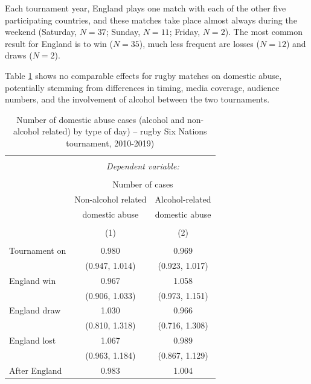 \documentclass[12pt, a4paper]{article}
\begin{document}
Each tournament year, England plays one match with each of the other five participating countries, and these matches take place almost always during the weekend (Saturday, $N = 37$; Sunday, $N = 11$; Friday, $N = 2$). The most common result for England is to win ($N = 35$), much less frequent are losses ($N = 12$) and draws ($N = 2$).


Table \ref{rugby} shows no comparable effects for rugby matches on domestic abuse, potentially stemming from differences in timing, media coverage, audience numbers, and the involvement of alcohol between the two tournaments. 


\begin{table}[!htbp] \centering 
  \begin{threeparttable}
  \caption{Number of domestic abuse cases (alcohol and non-alcohol related) by type of day) -- rugby Six Nations tournament, 2010-2019)} 
  \label{rugby} 
\begin{tabular}{@{\extracolsep{5pt}}lcc} 
\\[-1.8ex]\hline 
\hline \\[-1.8ex] 
 & \multicolumn{2}{c}{\textit{Dependent variable:}} \\ 
\cline{2-3} 
\\[-1.8ex] & \multicolumn{2}{c}{Number of cases} \\ 
 & Non-alcohol related & Alcohol-related\\ 
 & domestic abuse & domestic abuse\\
\\[-1.8ex] & (1) & (2)\\ 
\hline \\[-1.8ex] 
 Tournament on & 0.980 & 0.969 \\ 
  & (0.947, 1.014) & (0.923, 1.017) \\ 
 England win & 0.967 & 1.058 \\ 
  & (0.906, 1.033) & (0.973, 1.151) \\ 
 England draw & 1.030 & 0.966 \\ 
  & (0.810, 1.318) & (0.716, 1.308) \\ 
 England lost & 1.067 & 0.989 \\ 
  & (0.963, 1.184) & (0.867, 1.129) \\ 
 After England & 0.983 & 1.004 \\ 

\end{tabular}
\end{threeparttable}
\end{table}
\end{document}
